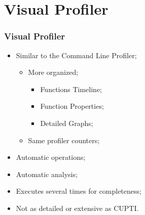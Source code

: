 \section{Visual Profiler}

{
	\frame[plain]{}
}

\begin{frame}
	\frametitle{Visual Profiler}
	\begin{itemize}
		\item Similar to the Command Line Profiler;
		\vfill
		\begin{itemize}
			\item More organized;
			\begin{itemize}
				\item Functions Timeline;
				\item Function Properties;
				\item Detailed Graphs;
			\end{itemize}
			\item Same profiler counters;
		\end{itemize}
		\vfill
		\item Automatic operations;
		\vfill
		\item Automatic analysis;
		\vfill
		\item Executes several times for completeness;
		\vfill
		\item Not as detailed or extensive as CUPTI.
	\end{itemize}
\end{frame}